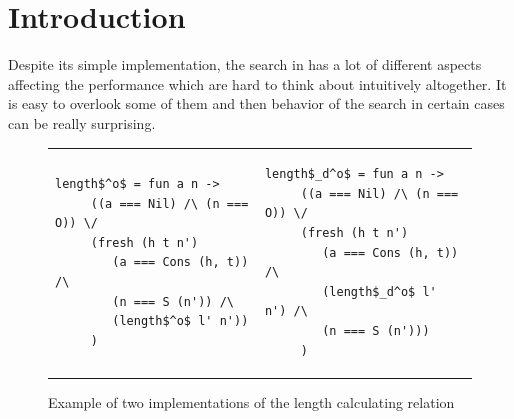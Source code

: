 \section{Introduction}

Despite its simple implementation, the search in \mK has a lot of different aspects affecting the performance which are hard to think about intuitively altogether. It is easy to overlook some of them and then behavior of the search in certain cases can be really surprising.

\begin{figure}[t]
\begin{tabular}{p{5cm}p{5cm}}
\begin{lstlisting}[basicstyle=\small]
   length$^o$ = fun a n ->
     ((a === Nil) /\ (n === O)) \/
     (fresh (h t n')
        (a === Cons (h, t)) /\
        (n === S (n')) /\
        (length$^o$ l' n'))
     )
\end{lstlisting} &
\begin{lstlisting}[basicstyle=\small]
   length$_d^o$ = fun a n ->
     ((a === Nil) /\ (n === O)) \/
     (fresh (h t n')
        (a === Cons (h, t)) /\
        (length$_d^o$ l' n') /\
        (n === S (n')))
     )
\end{lstlisting}
\end{tabular}
\caption{Example of two implementations of the length calculating relation}
\label{fig:length_implementations}
\end{figure}

